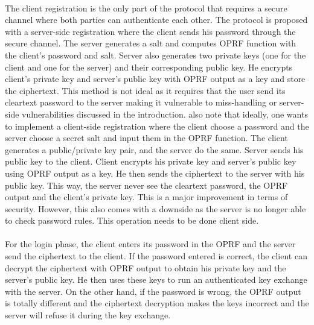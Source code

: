 ﻿\documentclass[../report.tex]{subfiles}
\begin{document}
\paragraph{} \label{sec:opaque_register}
The client registration is the only part of the protocol that requires a secure channel where both parties can authenticate each other.
The protocol is proposed with a server-side registration where the client sends his password through the secure channel. The server generates a salt and computes OPRF function with the client's password and salt. Server also generates two private keys (one for the client and one for the server) and their corresponding public key. He encrypts client's private key and server's public key with OPRF output as a key and store the ciphertext.
This method is not ideal as it requires that the user send its cleartext password to the server making it vulnerable to miss-handling or server-side vulnerabilities discussed in the introduction.
\cite{OPAQUE_Paper} also note that ideally, one wants to implement a client-side registration where the client choose a password and the server choose a secret salt and input them in the OPRF function. The client generates a public/private key pair, and the server do the same. Server sends his public key to the client. Client encrypts his private key and server's public key using OPRF output as a key. He then sends the ciphertext to the server with his public key.
This way, the server never see the cleartext password, the OPRF output and the client's private key. This is a major improvement in terms of security.
However, this also comes with a downside as the server is no longer able to check password rules. This operation needs to be done client side.
\paragraph{}
For the login phase, the client enters its password in the OPRF and the server send the ciphertext to the client.
If the password entered is correct, the client can decrypt the ciphertext with OPRF output to obtain his private key and the server's public key.
He then uses these keys to run an authenticated key exchange with the server.
On the other hand, if the password is wrong, the OPRF output is totally different and the ciphertext decryption makes the keys incorrect and the server will refuse it during the key exchange. %
\end{document}
